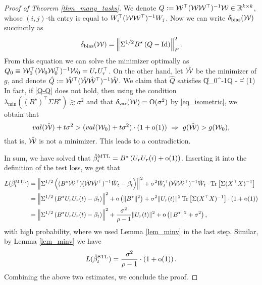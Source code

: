 \begin{proof}[Proof of Theorem \ref{thm_many_tasks}]
We denote $Q := \cal W^{\top} (\cal W\cal W^{\top})^{-1} \cal W \in\real^{k\times k}$, whose $(i,j)$-th entry is equal to $W_i^{\top} (\cal W\cal W^{\top})^{-1} W_j$.
	Now we can write $\delta_{\bias}(\cal W)$ succinctly as
	\begin{align*}
		\delta_{\bias}(\cal W) = \bignormFro{\Sigma^{1/2}B^{\star}  \bigbrace{Q -\id}}^2 .
	\end{align*}
	From this equation we can solve the minimizer optimally as $Q_0\equiv  \cal W_0^{\top} (\cal W_0\cal W_0^{\top})^{-1} \cal W_0=U_{r}U_r^{\top}$. On the other hand, let $\hat {\cal W}$ be the minimizer of $g$, and denote $\hat Q:= \hat{\cal W}^{\top} (\hat{\cal W}\hat{\cal W}^{\top})^{-1} \hat{\cal W} $. We claim that $\hat Q$ satisfies
	\be\label{Q-Q}\|Q_0^{-1}\hat Q - \id\| = \oo(1) \quad {}\ee
	In fact, if \eqref{Q-Q} does not hold, then using the condition $\lambda_{\min}((B^{\star})^\top\Sigma B^{\star})\gtrsim \sigma^2$ and that $\delta_{\vari}(\cal W)=\OO(\sigma^2)$ by \eqref{eq_isometric}, we obtain that
	$$   \val(\hat {\cal W}) + t  \sigma^2 > (\val( {\cal W}_0) + t \sigma^2 )\cdot (1+\oo(1)) \ \Rightarrow \ g( \hat{\cal W})>g( {\cal W}_0),$$
	that is, $\hat {\cal W}$ is not a minimizer. This leads to a contradiction.

	In sum, we have solved that $\hat{\beta}_i^{\MTL}=B^{\star}\left( U_r U_r(i) +\oo(1)\right)$. Inserting it into the definition of the test loss, we get that
	\begin{align*}
		\te(\hat{\beta}_t^{\MTL}) &= \bignorm{\Sigma^{1/2} \left((B^\star \hat{\cal W}^\top) (\hat{\cal W}\hat{\cal W}^{\top})^{-1} \hat W_t - \beta_t \right) }^2
		+ \sigma^2  \hat W_t^{\top} (\hat{\cal W}\hat{\cal W}^{\top})^{-1} \hat W_t \cdot \bigtr{\Sigma (X^{\top}X)^{-1}} \\
		&= \bignorm{\Sigma^{1/2} \bigbrace{B^{\star} U_r U_r(t)-\beta_t}}^2 + \oo\left(\|B^\star\|^2\right) + \sigma^2\norm{U_r(t)}^2 \bigtr{\Sigma (X^{\top}X)^{-1}} \cdot (1+\oo(1))\\
		&= \bignorm{\Sigma^{1/2} \bigbrace{B^{\star} U_r U_r(t)-\beta_t}}^2 + \frac{\sigma^2}{\rho-1}\norm{U_r(t)}^2 + \oo \left( \|B^\star\|^2 + \sigma^2\right),
	\end{align*}
	with high probability, where we used Lemma \ref{lem_minv} in the last step. Similar, by Lemma \ref{lem_minv} we have
	$$\te(\hat{\beta}_t^{\STL})=\frac{\sigma^2}{\rho-1} \cdot \left( 1+\oo(1)\right).$$
Combining the above two estimates, we conclude the proof.
\end{proof}
